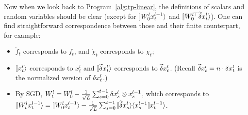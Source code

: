 \documentclass{article}
\theoremstyle{plain}
\theoremstyle{definition}
\begin{document}
Now when we look back to Program~\ref{alg:tp-linear}, the definitions of scalars and random variables should be clear (except for $\ket{W_0^l x_t^{l-1}}$ and $\ket{W_0^{l\top} \tilde\del x_t^l}$). One can find straightforward correspondence between those and their finite counterpart, for example: \begin{itemize}
    \item $\mathring f_t$ corresponds to $f_t$, and $\mathring \chi_t$ corresponds to $\chi_t$;
    \item $\ket{x_t^l}$ corresponds to $x_t^l$ and $\ket{\tilde\del x_t^l}$ corresponds to $\widetilde{\delta} x_t^l$. (Recall $\widetilde{\delta} x_t^l=n\cdot \delta x_t^l$ is the normalized version of $\delta x_t^l$.)
    \item By SGD, $W_t^l = W_0^l - \frac{1}{\sqrt L}\sum_{s=0}^{t-1} \delta x_s^l \otimes x_s^{l-1} $, which corresponds to $\ket{W_t^l x_t^{l-1}} = \ket{W_0^l x_t^{l-1}} - \frac1{\sqrt L} \sum_{s=0}^{t-1} \ket{\tilde\del x_s^{l}} \braket{x_s^{l-1}}{x_t^{l-1}}$.
\end{itemize}
\end{document}
